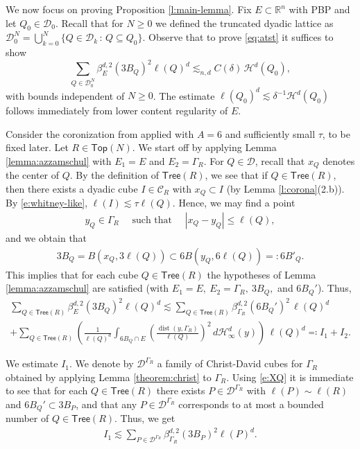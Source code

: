 \documentclass[11pt,reqno]{amsart}
\newcommand{\Top}{\mathsf{Top}}
\def\cC{{\mathscr{C}}}
\newcommand{\Tree}{\mathsf{Tree}}
\def\dist{\mathop\mathrm{dist}} 						%
\newcommand{\ps}[1]{\left( #1 \right)}
\theoremstyle{definition}
\theoremstyle{remark}
\numberwithin{equation}{section}
\newcommand{\R}{\mathbb{R}}
\newcommand{\hd}{\mathcal{H}^d}
\newcommand{\hdc}{\mathcal{H}^d_\infty}
\newcommand{\dD}{\mathcal{D}}
\newcommand{\DD}{\mathcal{D}}
\theoremstyle{theorem}
\theoremstyle{definition}
\theoremstyle{remark}
\numberwithin{equation}{section}
\begin{document}
	We now focus on proving Proposition \ref{l:main-lemma}. Fix $E\subset\R^n$ with PBP and let $Q_0\in\DD_0$. Recall that for $N\ge 0$ we defined the truncated dyadic lattice as $\dD_0^N=\bigcup_{k=0}^{N}\{Q\in \dD_{k}\, : \,Q\subseteq Q_0\}$. Observe that to prove \eqref{eq:atst} it suffices to show
	\begin{equation*}
	\sum_{Q \in \dD_0^N} \beta_E^{d,2}(3B_Q)^2 \ell(Q)^d \lesssim_{n,d} C( \delta) \, \hd(Q_0),
	\end{equation*}
	with bounds independent of $N\ge 0$. The estimate $\ell(Q_0)^d\lesssim \delta^{-1} \hd(Q_0)$ follows immediately from lower content regularity of $E$. 

	Consider the coronization from  applied with $A=6$ and sufficiently small $\tau$, to be fixed later. Let $R\in \Top(N)$. We start off by applying Lemma \ref{lemma:azzamschul} with $E_1=E$ and $E_2 = \Gamma_R$. For $Q \in \dD$, recall that $x_Q$ denotes the center of $Q$. By the definition of $ \Tree(R)$, we see that if $Q \in \Tree(R)$, then there exists a dyadic cube $I \in \cC_R$ with $x_Q\subset I$ (by Lemma \ref{l:corona}(2.b)). By \eqref{e:whitney-like}, $\ell(I) \lesssim \tau \ell(Q)$. Hence, we may find a point
	\begin{align}\label{e:XQ}
	y_Q \in \Gamma_R \quad \mbox{ such that } \quad |x_Q - y_Q| \leq \ell(Q),
	\end{align}
	and we obtain that
	\begin{align}\label{e:form500}
	3B_Q = B(x_Q, 3\ell(Q)) \subset 6B(y_Q, 6\ell(Q))=: 6B'_Q.
	\end{align}
	This implies that for each cube $Q \in  \Tree(R)$ the hypotheses of Lemma \ref{lemma:azzamschul} are satisfied (with $E_1 = E,\ E_2 = \Gamma_R,\ 3B_Q,$ and $6B_Q'$). Thus,
	\begin{multline}\label{eq:boh}
	\sum_{Q \in \Tree(R)} \beta_{E}^{d, 2} (3 B_Q)^2 \ell(Q)^d  \lesssim \sum_{Q \in \Tree(R)} \beta_{\Gamma_R}^{d,2} (6 B_Q')^2 \, \ell(Q)^d \\
	 + \sum_{Q \in  \Tree(R)} \ps{\frac{1}{\ell(Q)^d} \int_{6 B_Q\cap E} \ps{\frac{\dist(y, \Gamma_R)}{\ell(Q)}}^2 \, d \hdc(y) }\, \ell(Q)^d 
	 \eqqcolon I_1 + I_2.
	\end{multline}
	
	We estimate $I_1$. We denote by $\dD^{\Gamma_R}$ a family of Christ-David cubes for $\Gamma_R$ obtained by applying Lemma \ref{theorem:christ} to $\Gamma_R$. Using \eqref{e:XQ} it is immediate to see that for each $Q\in\Tree(R)$ there exists $P\in\dD^{\Gamma_R}$ with $\ell(P)\sim\ell(R)$ and $6B_Q'\subset 3B_P$, and that any $P\in \dD^{\Gamma_R}$ corresponds to at most a bounded number of $Q\in\Tree(R)$. Thus, we get
	\begin{align*}
	I_1 \lesssim \sum_{P \in \dD^{\Gamma_R}} \beta_{\Gamma_R}^{d,2}(3 B_P)^2 \ell(P)^d.
	\end{align*}
	
\end{document}
